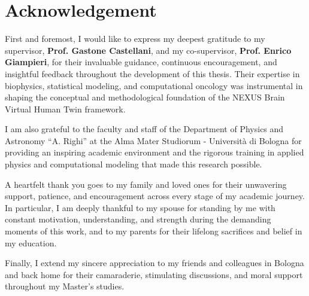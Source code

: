 \section*{Acknowledgement}

First and foremost, I would like to express my deepest gratitude to my supervisor, \textbf{Prof. Gastone Castellani}, and my co-supervisor, \textbf{Prof. Enrico Giampieri}, for their invaluable guidance, continuous encouragement, and insightful feedback throughout the development of this thesis. Their expertise in biophysics, statistical modeling, and computational oncology was instrumental in shaping the conceptual and methodological foundation of the NEXUS Brain Virtual Human Twin framework.

I am also grateful to the faculty and staff of the Department of Physics and Astronomy ``A. Righi'' at the Alma Mater Studiorum - Università di Bologna for providing an inspiring academic environment and the rigorous training in applied physics and computational modeling that made this research possible.

A heartfelt thank you goes to my family and loved ones for their unwavering support, patience, and encouragement across every stage of my academic journey. In particular, I am deeply thankful to my spouse for standing by me with constant motivation, understanding, and strength during the demanding moments of this work, and to my parents for their lifelong sacrifices and belief in my education.

Finally, I extend my sincere appreciation to my friends and colleagues in Bologna and back home for their camaraderie, stimulating discussions, and moral support throughout my Master's studies.